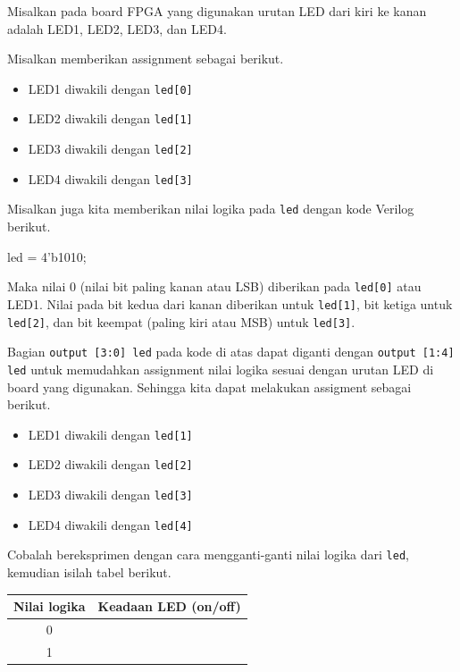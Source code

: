 \documentclass[a4paper,12pt,bahasa]{extarticle}
\begin{document}
\begin{mdframed}[style=verilognotes,frametitle={Catatan Verilog}]
Misalkan pada board FPGA yang digunakan urutan LED dari kiri ke kanan adalah LED1,
LED2, LED3, dan LED4.

Misalkan memberikan assignment sebagai berikut.
\begin{itemize}
\item LED1 diwakili dengan {\tt led[0]}
\item LED2 diwakili dengan {\tt led[1]}
\item LED3 diwakili dengan {\tt led[2]}
\item LED4 diwakili dengan {\tt led[3]}
\end{itemize}


Misalkan juga kita memberikan nilai logika pada {\tt led} dengan
kode Verilog berikut.
\begin{verilogcode}
  led = 4'b1010;
\end{verilogcode}
Maka nilai 0 (nilai bit paling kanan atau LSB) diberikan pada {\tt led[0]}
atau LED1. Nilai pada bit kedua dari kanan diberikan untuk {\tt led[1]}, bit ketiga
untuk {\tt led[2]}, dan bit keempat (paling kiri atau MSB) untuk {\tt led[3]}.

Bagian {\tt output [3:0] led} pada kode di atas dapat diganti
dengan {\tt output [1:4] led} untuk memudahkan assignment nilai logika
sesuai dengan urutan LED di board yang digunakan. Sehingga kita dapat
melakukan assigment sebagai berikut.
\begin{itemize}
\item LED1 diwakili dengan {\tt led[1]}
\item LED2 diwakili dengan {\tt led[2]}
\item LED3 diwakili dengan {\tt led[3]}
\item LED4 diwakili dengan {\tt led[4]}
\end{itemize}

\end{mdframed}

Cobalah bereksprimen dengan cara mengganti-ganti nilai logika
dari {\tt led}, kemudian isilah tabel berikut.

\begin{table}[H]
\centering
\begin{tabular}{|c|c|}
\hline
Nilai logika & Keadaan LED (on/off) \\
\hline
0 & \\
1 & \\
\hline
\end{tabular}
\par
\end{table}
\end{document}
